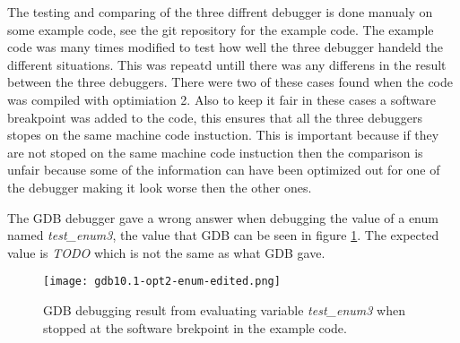 

The testing and comparing of the three diffrent debugger is done manualy on some example code, see the git repository \cite{example-code} for the example code.
The example code was many times modified to test how well the three debugger handeld the different situations.
This was repeatd untill there was any differens in the result between the three debuggers.
There were two of these cases found when the code was compiled with optimiation 2.
Also to keep it fair in these cases a software breakpoint was added to the code, this ensures that all the three debuggers stopes on the same machine code instuction.
This is important because if they are not stoped on the same machine code instuction then the comparison is unfair because some of the information can have been optimized out for one of the debugger making it look worse then the other ones.


The \gls{GDB} debugger gave a wrong answer when debugging the value of a enum named \emph{test\_enum3}, the value that \gls{GDB} can be seen in figure \ref{fig:gdbenum}.
The expected value is \emph{TODO} which is not the same as what \gls{GDB} gave.


\begin{figure}[h]
	\centering
	\texttt{[image: gdb10.1-opt2-enum-edited.png]}
	\caption{\gls{GDB} debugging result from evaluating variable \emph{test\_enum3} when stopped at the software brekpoint in the example code.}
	\label{fig:gdbenum}
\end{figure}



